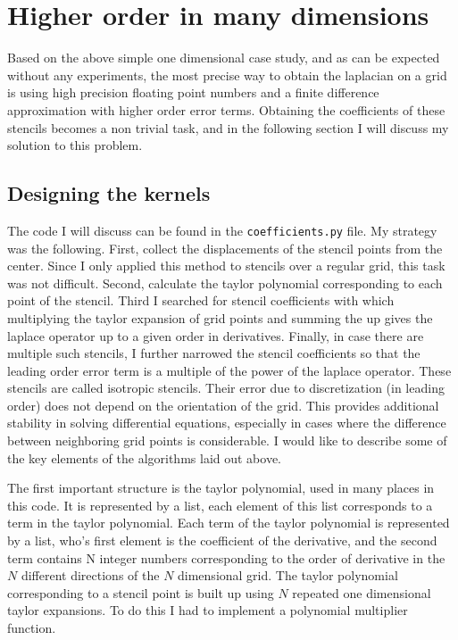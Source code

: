 \documentclass[pdftex,12pt,a4paper]{article}
\begin{document}
	\section{Higher order in many dimensions}
		Based on the above simple one dimensional case study, and as can be expected without any experiments, the most precise way to obtain the laplacian on a grid is using high precision floating point numbers and a finite difference approximation with higher order error terms. Obtaining the coefficients of these stencils becomes a non trivial task, and in the following section I will discuss my solution to this problem.
	\subsection{Designing the kernels}
		The code I will discuss can be found in the \texttt{coefficients.py} file. My strategy was the following. First, collect the displacements of the stencil points from the center. Since I only applied this method to stencils over a regular grid, this task was not difficult. Second, calculate the taylor polynomial corresponding to each point of the stencil. Third I searched for stencil coefficients with which multiplying the taylor expansion of grid points and summing the up gives the laplace operator up to a given order in derivatives. Finally, in case there are multiple such stencils, I further narrowed the stencil coefficients so that the leading order error term is a multiple of the power of the laplace operator. These stencils are called isotropic stencils. Their error due to discretization (in leading order) does not depend on the orientation of the grid. This provides additional stability in solving differential equations, especially in cases where the difference between neighboring grid points is considerable. I would like to describe some of the key elements of the algorithms laid out above.
		
		The first important structure is the taylor polynomial, used in many places in this code. It is represented by a list, each element of this list corresponds to a term in the taylor polynomial. Each term of the taylor polynomial is represented by a list, who's first element is the coefficient of the derivative, and the second term contains N integer numbers corresponding to the order of derivative in the $N$ different directions of the $N$ dimensional grid. The taylor polynomial corresponding to a stencil point is built up using $N$ repeated one dimensional taylor expansions. To do this I had to implement a polynomial multiplier function.
		
\end{document}
